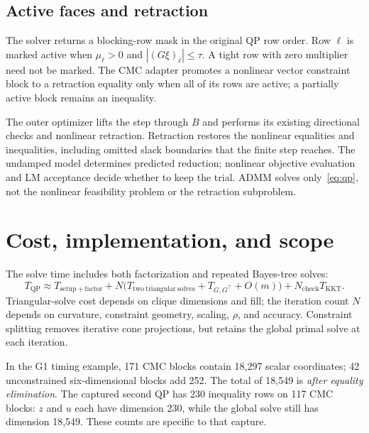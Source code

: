 \documentclass[11pt,letterpaper]{article}
\begin{document}
\subsection{Active faces and retraction}
The solver returns a blocking-row mask in the original QP row order. Row
$\ell$ is marked active when $\mu_\ell>0$ and
$|(G\xi)_\ell|\leq\tau$. A tight row with zero multiplier need not be marked.
The CMC adapter promotes a nonlinear vector constraint block to a retraction
equality only when all of its rows are active; a partially active block
remains an inequality.

The outer optimizer lifts the step through $B$ and performs its existing
directional checks and nonlinear retraction. Retraction restores the nonlinear
equalities and inequalities, including omitted slack boundaries that the
finite step reaches. The undamped model determines predicted reduction;
nonlinear objective evaluation and LM acceptance decide whether to keep the
trial. ADMM solves only~\eqref{eq:qp}, not the nonlinear feasibility problem
or the retraction subproblem.

\newpage
\section{Cost, implementation, and scope}
The solve time includes both factorization and repeated Bayes-tree solves:
\begin{equation}
  T_{\mathrm{QP}}\approx T_{\mathrm{setup+factor}}
    +N\bigl(T_{\mathrm{two\ triangular\ solves}}+T_{G,G^\top}+O(m)\bigr)
    +N_{\mathrm{check}}T_{\mathrm{KKT}}.
\end{equation}
Triangular-solve cost depends on clique dimensions and fill; the iteration
count $N$ depends on curvature, constraint geometry, scaling, $\rho$, and
accuracy. Constraint splitting removes iterative cone projections, but
retains the global primal solve at each iteration.

In the G1 timing example, 171 CMC blocks contain 18,297 scalar coordinates;
42 unconstrained six-dimensional blocks add 252. The total of 18,549 is
\emph{after equality elimination}. The captured second QP has 230 inequality
rows on 117 CMC blocks: $z$ and $u$ each have dimension 230, while the global
solve still has dimension 18,549. These counts are specific to that capture.
\end{document}

